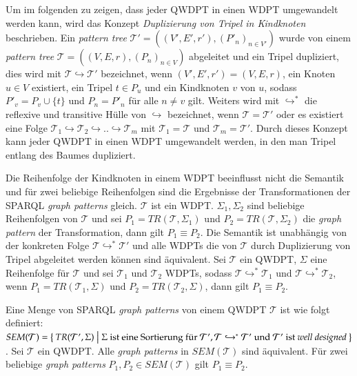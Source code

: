 \documentclass[draft,final]{vutinfth} %
\begin{document}
Um im folgenden zu zeigen, dass jeder QWDPT in einen WDPT umgewandelt werden kann, wird das Konzept \textit{Duplizierung von Tripel in Kindknoten} beschrieben. Ein \textit{pattern tree} $\mathcal{T}' = ((V',E',r'),(P'_n)_{n \in V'})$ wurde von einem \textit{pattern tree} $\mathcal{T} = ((V,E,r),(P_n)_{n \in V})$ abgeleitet und ein Tripel dupliziert, dies wird mit $\mathcal{T} \hookrightarrow \mathcal{T}'$ bezeichnet, wenn $(V',E',r') = (V,E,r)$, ein Knoten $u \in V$ existiert, ein Tripel $t \in P_u$ und ein Kindknoten $v$ von $u$, sodass $P'_v = P_v \cup \{t\}$ und $P_n = P'_n$ für alle $n \neq v$ gilt. Weiters wird mit $\hookrightarrow^*$ die reflexive und transitive Hülle von $\hookrightarrow$ bezeichnet, wenn $\mathcal{T} = \mathcal{T}'$ oder es existiert eine Folge $\mathcal{T}_1 \hookrightarrow \mathcal{T}_2 \hookrightarrow .. \hookrightarrow \mathcal{T}_m$ mit $\mathcal{T}_1 = \mathcal{T}$ und $\mathcal{T}_m = \mathcal{T}'$. Durch dieses Konzept kann jeder QWDPT in einen WDPT umgewandelt werden, in den man Tripel entlang des Baumes dupliziert.

Die Reihenfolge der Kindknoten in einem WDPT beeinflusst nicht die Semantik und für zwei beliebige Reihenfolgen sind die Ergebnisse der Transformationen der SPARQL \textit{graph patterns} gleich. $\mathcal{T}$ ist ein WDPT. $\Sigma_1, \Sigma_2$ sind beliebige Reihenfolgen von $\mathcal{T}$ und sei $P_1 = TR(\mathcal{T},\Sigma_1)$ und $P_2 = TR(\mathcal{T},\Sigma_2)$ die \textit{graph pattern} der Transformation, dann gilt $P_1 \equiv P_2$. Die Semantik ist unabhängig von der konkreten Folge $\mathcal{T} \hookrightarrow^* \mathcal{T}'$ und alle WDPTs die von $\mathcal{T}$ durch Duplizierung von Tripel abgeleitet werden können sind äquivalent. Sei $\mathcal{T}$ ein QWDPT, $\Sigma$ eine Reihenfolge für $\mathcal{T}$ und sei $\mathcal{T}_1$ und $\mathcal{T}_2$ WDPTs, sodass $\mathcal{T} \hookrightarrow^* \mathcal{T}_1$ und $\mathcal{T} \hookrightarrow^* \mathcal{T}_2$, wenn $P_1 = TR(\mathcal{T}_1,\Sigma)$ und $P_2 = TR(\mathcal{T}_2,\Sigma)$, dann gilt $P_1 \equiv P_2$.

Eine Menge von SPARQL \textit{graph patterns} von einem QWDPT $\mathcal{T}$ ist wie folgt definiert: $SEM(\mathcal{T}) = \Set{TR(\mathcal{T}',\Sigma) | \Sigma \text{ ist eine Sortierung für } \mathcal{T}', \mathcal{T} \hookrightarrow^* \mathcal{T}' \text{ und } \mathcal{T}' \text{ ist } \textit{well designed}}$. Sei $\mathcal{T}$ ein QWDPT. Alle \textit{graph patterns} in $SEM(\mathcal{T})$ sind äquivalent. Für zwei beliebige \textit{graph patterns} $P_1, P_2 \in SEM(\mathcal{T})$ gilt $P_1 \equiv P_2$.
\end{document}
